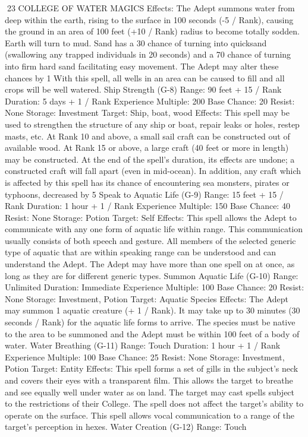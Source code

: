 \documentclass[a4paper]{article}
\begin{document}
\begin{multicols}{3}
23 COLLEGE OF WATER MAGICS
Effects: The Adept summons water from deep
within the earth, rising to the surface in 100 seconds (-5 / Rank), causing the ground in an area of
100 feet (+10 / Rank) radius to become totally
sodden. Earth will turn to mud. Sand has a 30%
chance of turning into quicksand (swallowing any
trapped individuals in 20 seconds) and a 70%
chance of turning into firm hard sand facilitating
easy movement. The Adept may alter these
chances by 1%
With this spell, all wells in an area can be caused to
fill and all crops will be well watered.
Ship Strength (G-8)
Range: 90 feet + 15 / Rank
Duration: 5 days + 1 / Rank
Experience Multiple: 200
Base Chance: 20%
Resist: None
Storage: Investment
Target: Ship, boat, wood
Effects: This spell may be used to strengthen the
structure of any ship or boat, repair leaks or holes,
restep masts, etc. At Rank 10 and above, a small
sail craft can be constructed out of available wood.
At Rank 15 or above, a large craft (40 feet or more
in length) may be constructed. At the end of the
spell’s duration, its effects are undone; a constructed craft will fall apart (even in mid-ocean). In
addition, any craft which is affected by this spell
has its chance of encountering sea monsters, pirates
or typhoons, decreased by 5%
Speak to Aquatic Life (G-9)
Range: 15 feet + 15 / Rank
Duration: 1 hour + 1 / Rank
Experience Multiple: 150
Base Chance: 40%
Resist: None
Storage: Potion
Target: Self
Effects: This spell allows the Adept to communicate with any one form of aquatic life within range.
This communication usually consists of both
speech and gesture. All members of the selected
generic type of aquatic that are within speaking
range can be understood and can understand the
Adept. The Adept may have more than one spell on
at once, as long as they are for different generic
types.
Summon Aquatic Life (G-10)
Range: Unlimited
Duration: Immediate
Experience Multiple: 100
Base Chance: 20%
Resist: None
Storage: Investment, Potion
Target: Aquatic Species
Effects: The Adept may summon 1 aquatic creature
(+ 1 / Rank). It may take up to 30 minutes (30
seconds / Rank) for the aquatic life forms to arrive.
The species must be native to the area to be summoned and the Adept must be within 100 feet of a
body of water.
Water Breathing (G-11)
Range: Touch
Duration: 1 hour + 1 / Rank
Experience Multiple: 100
Base Chance: 25%
Resist: None
Storage: Investment, Potion
Target: Entity
Effects: This spell forms a set of gills in the subject’s neck and covers their eyes with a transparent
film. This allows the target to breathe and see
equally well under water as on land. The target
may cast spells subject to the restrictions of their
College. The spell does not affect the target’s ability to operate on the surface. This spell allows
vocal communication to a range of the target’s
perception in hexes.
Water Creation (G-12)
Range: Touch


\end{multicols}
\end{document}
